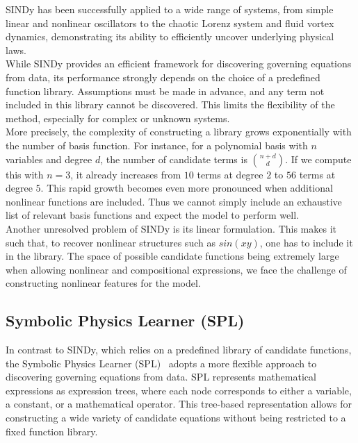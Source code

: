 \documentclass[11pt, a4paper]{article}
\begin{document}
SINDy has been successfully applied to a wide range of systems, from simple linear and nonlinear oscillators to the chaotic Lorenz system and fluid vortex dynamics, demonstrating its ability to efficiently uncover underlying physical laws. \\

While SINDy provides an efficient framework for discovering governing equations from data, its performance strongly depends on the choice of a predefined function library. Assumptions must be made in advance, and any term not included in this library cannot be discovered. This limits the flexibility of the method, especially for complex or unknown systems. \\

More precisely, the complexity of constructing a library grows exponentially with the number of basis function. For instance, for a polynomial basis with $n$ variables and degree $d$, the number of candidate terms is $\binom{n + d}{d}$. If we compute this with $n = 3$, it already increases from $10$ terms at degree $2$ to $56$ terms at degree $5$. This rapid growth becomes even more pronounced when additional nonlinear functions are included. Thus we cannot simply include an exhaustive list of relevant basis functions and expect the model to perform well. \\

Another unresolved problem of SINDy is its linear formulation. This makes it such that, to recover nonlinear structures such as $sin(xy)$, one has to include it in the library. The space of possible candidate functions being extremely large when allowing nonlinear and compositional expressions, we face the challenge of constructing nonlinear features for the model. 

\subsection{Symbolic Physics Learner (SPL)}

In contrast to SINDy, which relies on a predefined library of candidate functions, the Symbolic Physics Learner (SPL)~\cite{sun2023spl} adopts a more flexible approach to discovering governing equations from data. SPL represents mathematical expressions as expression trees, where each node corresponds to either a variable, a constant, or a mathematical operator. This tree-based representation allows for constructing a wide variety of candidate equations without being restricted to a fixed function library.\\
\end{document}
